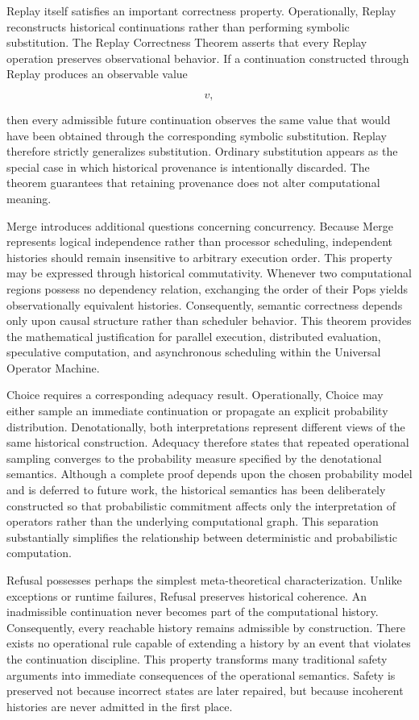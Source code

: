 \documentclass[12pt,oneside]{article}
\theoremstyle{definition}
\theoremstyle{remark}
\begin{document}
Replay itself satisfies an important correctness property. Operationally,
Replay reconstructs historical continuations rather than performing symbolic
substitution. The Replay Correctness Theorem asserts that every Replay
operation preserves observational behavior. If a continuation constructed
through Replay produces an observable value

\[
v,
\]

then every admissible future continuation observes the same value that would
have been obtained through the corresponding symbolic substitution. Replay
therefore strictly generalizes substitution. Ordinary substitution appears as
the special case in which historical provenance is intentionally discarded.
The theorem guarantees that retaining provenance does not alter computational
meaning.

Merge introduces additional questions concerning concurrency. Because Merge
represents logical independence rather than processor scheduling, independent
histories should remain insensitive to arbitrary execution order. This
property may be expressed through historical commutativity. Whenever two
computational regions possess no dependency relation, exchanging the order of
their Pops yields observationally equivalent histories. Consequently, semantic
correctness depends only upon causal structure rather than scheduler behavior.
This theorem provides the mathematical justification for parallel execution,
distributed evaluation, speculative computation, and asynchronous scheduling
within the Universal Operator Machine.

Choice requires a corresponding adequacy result. Operationally, Choice may
either sample an immediate continuation or propagate an explicit probability
distribution. Denotationally, both interpretations represent different views
of the same historical construction. Adequacy therefore states that repeated
operational sampling converges to the probability measure specified by the
denotational semantics. Although a complete proof depends upon the chosen
probability model and is deferred to future work, the historical semantics has
been deliberately constructed so that probabilistic commitment affects only
the interpretation of operators rather than the underlying computational
graph. This separation substantially simplifies the relationship between
deterministic and probabilistic computation.

Refusal possesses perhaps the simplest meta-theoretical characterization.
Unlike exceptions or runtime failures, Refusal preserves historical coherence.
An inadmissible continuation never becomes part of the computational history.
Consequently, every reachable history remains admissible by construction.
There exists no operational rule capable of extending a history by an event
that violates the continuation discipline. This property transforms many
traditional safety arguments into immediate consequences of the operational
semantics. Safety is preserved not because incorrect states are later
repaired, but because incoherent histories are never admitted in the first
place.
\end{document}
